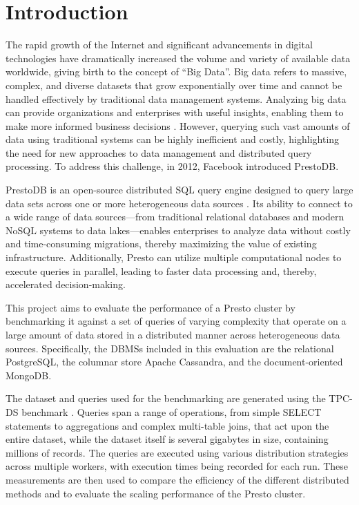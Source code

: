 \documentclass[conference]{IEEEtran}
\begin{document}
\section{Introduction}

The rapid growth of the Internet and significant advancements in digital technologies have dramatically increased the volume and variety of available data worldwide, giving birth to the concept of “Big Data”. Big data refers to massive, complex, and diverse datasets that grow exponentially over time and cannot be handled effectively by traditional data management systems. Analyzing big data can provide organizations and enterprises with useful insights, enabling them to make more informed business decisions \cite{b1,b2}. However, querying such vast amounts of data using traditional systems can be highly inefficient and costly, highlighting the need for new approaches to data management and distributed query processing. To address this challenge, in 2012, Facebook introduced PrestoDB.

PrestoDB is an open-source distributed SQL query engine designed to query large data sets across one or more heterogeneous data sources \cite{b3,b4}. Its ability to connect to a wide range of data sources---from traditional relational databases and modern NoSQL systems to data lakes---enables enterprises to analyze data without costly and time-consuming migrations, thereby maximizing the value of existing infrastructure.
Additionally, Presto can utilize multiple computational nodes to execute queries in parallel, leading to faster data processing and, thereby, accelerated decision-making.

This project aims to evaluate the performance of a Presto cluster by benchmarking it against a set of queries of varying complexity that operate on a large amount of data stored in a distributed manner across heterogeneous data sources. Specifically, the DBMSs included in this evaluation are the relational PostgreSQL, the columnar store Apache Cassandra, and the document-oriented MongoDB.

The dataset and queries used for the benchmarking are generated using the TPC-DS benchmark \cite{b5}. Queries span a range of operations, from simple SELECT statements to aggregations and complex multi-table joins, that act upon the entire dataset, while the dataset itself is several gigabytes in size, containing millions of records. The queries are executed using various distribution strategies across multiple workers, with execution times being recorded for each run. These measurements are then used to compare the efficiency of the different distributed methods and to evaluate the scaling performance of the Presto cluster.
\end{document}
